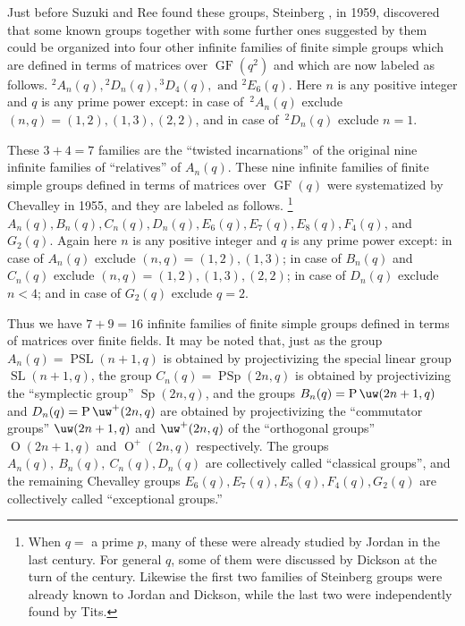Just before Suzuki and Ree found these groups, Steinberg 
\cite{St}, in
1959, discovered that some known groups together with some 
further ones
suggested by them could be organized into 
four other infinite families of finite simple
groups which are defined in terms of matrices over 
$\operatorname{GF}(q^2)$ and which 
are now labeled as follows. 
{}${}^2A_n(q), {}^2D_n(q), 
{}^3D_4(q), \text{ and }
{}^2E_6(q)$. Here $n$ is any positive integer and $q$ is 
any prime power
except: in case of $\,^2A_n(q)$ exclude 
$(n,q)=(1,2),(1,3),(2,2)$, and in case
of $\,^2D_n(q)$ exclude $n=1$.

These $3+4=7$ families are the ``twisted incarnations'' of 
the original
nine infinite families of ``relatives'' of $A_n(q)$.  
These nine infinite 
families of finite simple groups defined in terms of 
matrices over 
$\operatorname{GF}(q)$ 
were systematized by Chevalley \cite{Ch} in 1955, and they 
are labeled as 
follows. 
\footnote{When $q=$ a prime $p$, many of these were 
already studied by
Jordan \cite{J1} in the last century. For general $q$\<, 
some of them were
discussed by Dickson \cite{D1} at the turn of the century. 
Likewise the
first two families of Steinberg groups were already known 
to Jordan and
Dickson, while the last two were independently found by 
Tits.}
{} $A_n(q), B_n(q), C_n(q), 
D_n(q), E_6(q), E_7(q), 
E_8(q), F_4(q)$, and $G_2(q)$. Again here $n$ is any 
positive integer and $q$ is any prime power except: in 
case of $A_n(q)$ exclude 
$(n,q)=(1,2),(1,3)$; in case of $B_n(q)$ and $C_n(q)$  
exclude 
$(n,q)=(1,2),(1,3),(2,2)$; in case of $D_n(q)$ exclude 
$n<4$; and in case of
$G_2(q)$ exclude $q=2$.

Thus we have $7+9=16$ infinite families of finite simple 
groups defined
in terms of matrices over finite fields.  
It may be noted that, just as the group 
$A_n(q)=\operatorname{PSL}(n+1,q)$ is obtained
by projectivizing the special linear group 
$\operatorname{SL}(n+1,q)$, 
the group $C_n(q)=\operatorname{PSp}(2n,q)$ is obtained 
by projectivizing the ``symplectic group'' 
$\operatorname{Sp}(2n,q)$, and the groups
$B_n(q)=\operatorname{P}
\uw(2n+1,q)$ and $D_n(q)=\operatorname{P}
\uw^+(2n,q)$ are obtained by projectivizing 
the ``commutator groups'' $\uw(2n+1,q)$ and $\uw^+(2n,q)$ 
of the 
``orthogonal groups'' $\operatorname{O}
(2n+1,q)$ and $\operatorname{O}^+(2n,q)$ respectively.
The groups $A_n(q),\ B_n(q),\ C_n(q),$$D_n(q)$ are 
collectively called 
``classical groups'', and the remaining Chevalley groups 
$E_6(q),E_7
(q),E_8(q),F_4(q),G_2(q)$ are collectively called 
``exceptional 
groups.''

